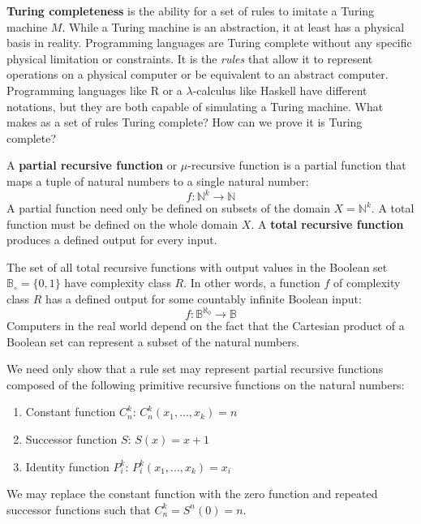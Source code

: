 \documentclass[10pt, a5paper, twoside, openright]{memoir}
\begin{document}
\textbf{Turing completeness} is the ability for a set of rules to imitate a Turing machine $M$. While a Turing machine is an abstraction, it at least has a physical basis in reality. Programming languages are Turing complete without any specific physical limitation or constraints. It is the \textit{rules} that allow it to represent operations on a physical computer or be equivalent to an abstract computer. Programming languages like R or a $\lambda$-calculus like Haskell have different notations, but they are both capable of simulating a Turing machine. What makes as a set of rules Turing complete? How can we prove it is Turing complete?

A \textbf{partial recursive function} or $\mu$-recursive function is a partial function that maps a tuple of natural numbers to a single natural number:
$$f: \mathbb N^k \rightarrow \mathbb N$$
A partial function need only be defined on subsets of the domain $X = \mathbb N^k$. A total function must be defined on the whole domain $X$. A \textbf{total recursive function} produces a defined output for every input.

The set of all total recursive functions with output values in the Boolean set $\mathbb B_\circ = \{0, 1\}$ have complexity class $R$. In other words, a function $f$ of complexity class $R$ has a defined output for some countably infinite Boolean input:
$$f: \mathbb B^{\aleph_0} \rightarrow \mathbb B$$
Computers in the real world depend on the fact that the Cartesian product of a Boolean set can represent a subset of the natural numbers.

We need only show that a rule set may represent partial recursive functions composed of the following primitive recursive functions on the natural numbers:
\begin{enumerate}
\item Constant function $C^k_n$: $C^k_n (x_1,...,x_k) = n$
\item Successor function $S$: $S(x) = x+1$
\item Identity function $P^k_i$: $P^k_i (x_1,...,x_k) = x_i$
\end{enumerate}
We may replace the constant function with the zero function and repeated successor functions such that $C^k_n = S^n (0) = n$. 
\end{document}

